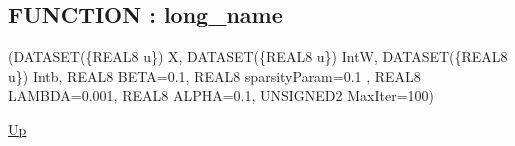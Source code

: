 \subsection*{FUNCTION : long\_name}
\hypertarget{ecldoc:example_3.mod_1.long_name}{}
\par
\begin{minipage}[t]{\textwidth}
\begin{flushleft}
  (DATASET(\{REAL8 u\}) X, DATASET(\{REAL8 u\}) IntW, DATASET(\{REAL8 u\}) Intb, REAL8 BETA=0.1, REAL8 sparsityParam=0.1 , REAL8 LAMBDA=0.001, REAL8 ALPHA=0.1, UNSIGNED2 MaxIter=100)
\end{flushleft}
\end{minipage}
\hyperlink{ecldoc:Example_3.mod_1}{Up} \\
\par
\par


